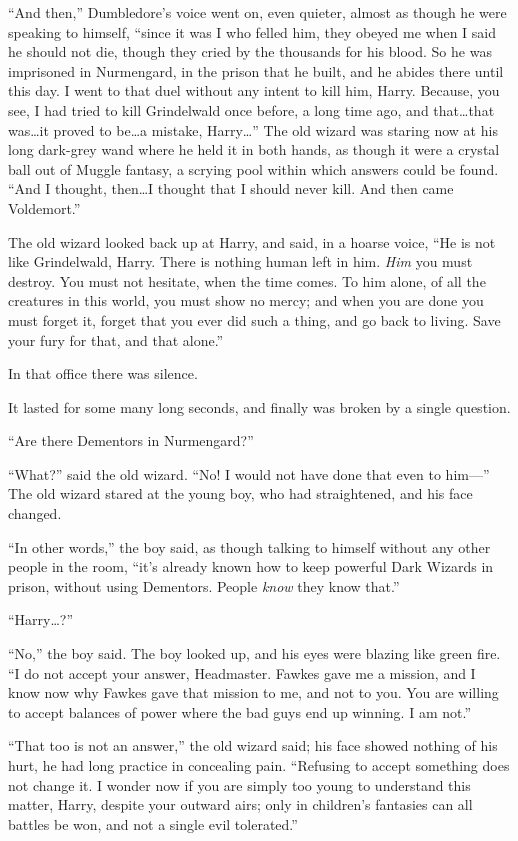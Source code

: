 “And then,” Dumbledore’s voice went on, even quieter, almost as though he were
speaking to himself, “since it was I who felled him, they obeyed me when I said
he should not die, though they cried by the thousands for his blood. So he was
imprisoned in Nurmengard, in the prison that he built, and he abides there
until this day. I went to that duel without any intent to kill him, Harry.
Because, you see, I had tried to kill Grindelwald once before, a long time ago,
and that…that was…it proved to be…a mistake,
Harry…” The old wizard was staring now at his long dark-grey wand where
he held it in both hands, as though it were a crystal ball out of Muggle
fantasy, a scrying pool within which answers could be found. “And I thought,
then…I thought that I should never kill. And then came Voldemort.”

The old wizard looked back up at Harry, and said, in a hoarse voice, “He is not
like Grindelwald, Harry. There is nothing human left in him. \emph{Him} you
must destroy. You must not hesitate, when the time comes. To him alone, of all
the creatures in this world, you must show no mercy; and when you are done you
must forget it, forget that you ever did such a thing, and go back to living.
Save your fury for that, and that alone.”

In that office there was silence.

It lasted for some many long seconds, and finally was broken by a single
question.

“Are there Dementors in Nurmengard?”

“What?” said the old wizard. “No! I would not have done that even to him—”
\later
The old wizard stared at the young boy, who had straightened, and his face
changed.

“In other words,” the boy said, as though talking to himself without any other
people in the room, “it’s already known how to keep powerful Dark Wizards in
prison, without using Dementors. People \emph{know} they know that.”

“Harry…?”

“No,” the boy said. The boy looked up, and his eyes were blazing like green
fire. “I do not accept your answer, Headmaster. Fawkes gave me a mission, and I
know now why Fawkes gave that mission to me, and not to you. You are willing to
accept balances of power where the bad guys end up winning. I am not.”

“That too is not an answer,” the old wizard said; his face showed nothing of
his hurt, he had long practice in concealing pain. “Refusing to accept
something does not change it. I wonder now if you are simply too young to
understand this matter, Harry, despite your outward airs; only in children’s
fantasies can all battles be won, and not a single evil tolerated.”

